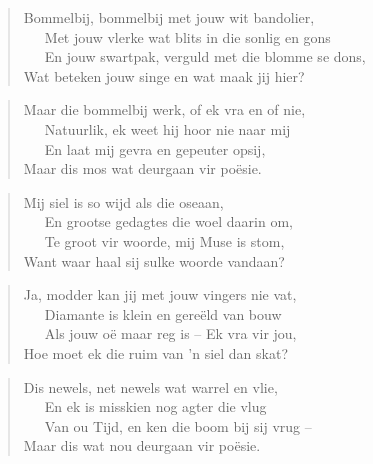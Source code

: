 \begin{verse}
Bommelbij, bommelbij met jouw wit bandolier, \\ 
\ \ \ Met jouw vlerke wat blits in die sonlig en gons \\ 
\ \ \ En jouw swartpak, verguld met die blomme se dons, \\ 
Wat beteken jouw singe en wat maak jij hier? \\ 
\end{verse}

\begin{verse}
Maar die bommelbij werk, of ek vra en of nie, \\ 
\ \ \ Natuurlik, ek weet hij hoor nie naar mij \\ 
\ \ \ En laat mij gevra en gepeuter opsij, \\ 
Maar dis mos wat deurgaan vir po\"esie. \\ 
\end{verse}

\begin{verse}
Mij siel is so wijd als die oseaan, \\ 
\ \ \ En grootse gedagtes die woel daarin om, \\ 
\ \ \ Te groot vir woorde, mij Muse is stom, \\ 
Want waar haal sij sulke woorde vandaan? \\ 
\end{verse}

\begin{verse}
Ja, modder kan jij met jouw vingers nie vat, \\ 
\ \ \ Diamante is klein en gere\"eld van bouw \\ 
\ \ \ Als jouw o\"e maar reg is -- Ek vra vir jou, \\ 
Hoe moet ek die ruim van ’n siel dan skat? \\ 
\end{verse}

\begin{verse}
Dis newels, net newels wat warrel en vlie, \\ 
\ \ \ En ek is misskien nog agter die vlug \\ 
\ \ \ Van ou Tijd, en ken die boom bij sij vrug --  \\ 
Maar dis wat nou deurgaan vir po\"esie. \\ 
\end{verse}